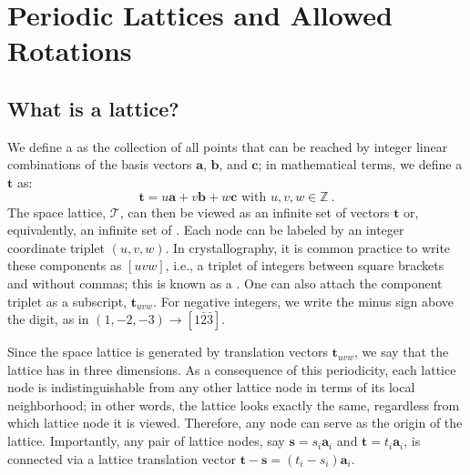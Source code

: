 \section{Periodic Lattices and Allowed Rotations}\label{\chabbr:sec:restrictions}

\subsection{What is a lattice?}\label{\chabbr:ssec:lattice}
We define a  as the collection of all points that can be reached by integer linear combinations of the basis vectors $\mathbf{a}$, $\mathbf{b}$, and $\mathbf{c}$; in mathematical terms, we define a  $\mathbf{t}$ as:
\begin{equation}
	\mathbf{t} = u\mathbf{a}+v\mathbf{b}+w\mathbf{c}\text{ with }u,v,w\in\mathbb{Z}\ .\label{\chabbr:eq:tvector}
\end{equation}
The space lattice, $\mathcal{T}$, can then be viewed as an infinite set of vectors $\mathbf{t}$ or, equivalently, an infinite set of .  Each node can be labeled by an integer coordinate triplet $(u,v,w)$.  In crystallography, it is common practice to write these components as $[uvw]$, i.e., a triplet of integers between square brackets and without commas; this is known as a .  One can also attach the component triplet as a subscript, $\mathbf{t}_{uvw}$.  For negative integers, we write the minus sign above the digit, as in $(1,-2,-3)\rightarrow [1\bar{2}\bar{3}]$.

Since the space lattice is generated by translation vectors $\mathbf{t}_{uvw}$, we say that the lattice has  in three dimensions.  As a consequence of this periodicity, each lattice node is indistinguishable from any other lattice node in terms of its local neighborhood; in other words, the lattice looks exactly the same, regardless from which lattice node it is viewed.  Therefore, any node can serve as the origin of the lattice.  Importantly, any pair of lattice nodes, say $\mathbf{s}=s_i\mathbf{a}_i$ and $\mathbf{t}=t_i\mathbf{a}_i$, is connected via a lattice translation vector $\mathbf{t}-\mathbf{s}=(t_i-s_i)\mathbf{a}_i$.

